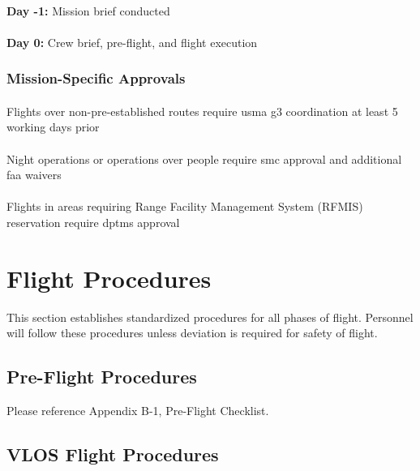        \paragraph{} \textbf{Day -1:} Mission brief conducted
        \paragraph{} \textbf{Day 0:} Crew brief, pre-flight, and flight execution

    \subsubsection{Mission-Specific Approvals}\label{ssec:missionapprovals} 

        \paragraph{} Flights over non-pre-established routes require \ac{usma} \ac{g3} coordination at least 5 working days prior
        \paragraph{} Night operations or operations over people require \ac{smc} approval and additional \ac{faa} waivers
        \paragraph{} Flights in areas requiring Range Facility Management System (RFMIS) reservation require \ac{dptms} approval

\section{Flight Procedures}\label{sec:flightprocedures}

This section establishes standardized procedures for all phases of flight. Personnel will follow these procedures unless deviation is required for safety of flight.

    \subsection{Pre-Flight Procedures}\label{ssec:preflight}
    Please reference Appendix B-1, Pre-Flight Checklist.
    \subsection{VLOS Flight Procedures}\label{ssec:inflight}

